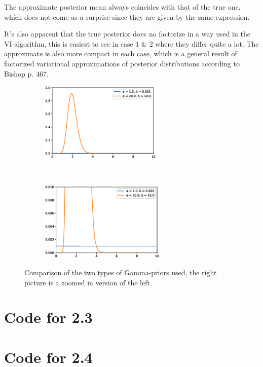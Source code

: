 \documentclass[a4paper]{article}
\begin{document}
The approximate posterior mean always coincides with that of the true one, which does not come as a surprise since they are given by the same expression. 

It's also apparent that the true posterior does no factorize in a way used in the VI-algorithm, this is easiest to see in case 1 \& 2 where they differ quite a lot. The approximate is also more compact in each case, which is a general result of factorized variational approximations of posterior distributions according to Bishop p. 467. 

\begin{figure}[h!]
	\centering
	\begin{subfigure}[t]{0.5\textwidth}
		\centering
		\includegraphics[height=1.5in]{Gamma1.eps}
	\end{subfigure}%
	~ 
	\begin{subfigure}[t]{0.5\textwidth}
		\centering
		\includegraphics[height=1.5in]{Gamma2.eps}
	\end{subfigure}
	\caption{\label{fig:Gamma}Comparison of the two types of Gamma-priors used, the right picture is a zoomed in version of the left.}
\end{figure}
\newpage
\appendix
\section{Code for 2.3}

\newpage
\section{Code for 2.4}

\end{document}
